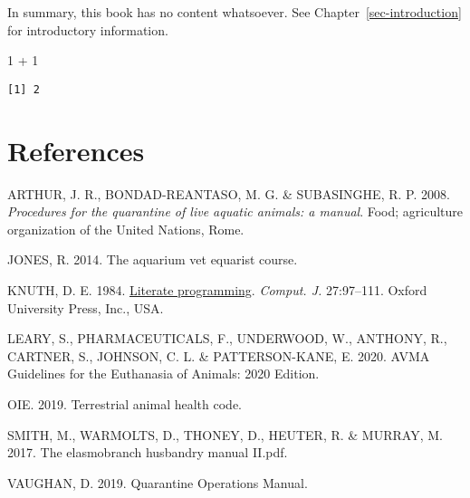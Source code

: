 \documentclass[
  letterpaper,
  DIV=11,
  numbers=noendperiod]{scrreprt}
\newenvironment{Shaded}{\begin{snugshade}}{\end{snugshade}}
\newcommand{\DecValTok}[1]{\textcolor[rgb]{0.25,0.63,0.44}{#1}}
\newcommand{\SpecialCharTok}[1]{\textcolor[rgb]{0.25,0.44,0.63}{#1}}
\newlength{\cslhangindent}
\newlength{\cslentryspacingunit} %
\newenvironment{CSLReferences}[2] %
 {%
  \setlength{\parindent}{0pt}
  \ifodd #1
  \let\oldpar\par
  \def\par{\hangindent=\cslhangindent\oldpar}
  \fi
  \setlength{\parskip}{#2\cslentryspacingunit}
 }%
 {}
\begin{document}
In summary, this book has no content whatsoever. See
Chapter~\ref{sec-introduction} for introductory information.

\begin{Shaded}
\begin{Highlighting}[]
\DecValTok{1} \SpecialCharTok{+} \DecValTok{1}
\end{Highlighting}
\end{Shaded}

\begin{verbatim}
[1] 2
\end{verbatim}


\hypertarget{references}{%
\chapter*{References}\label{references}}


\hypertarget{refs}{}
\begin{CSLReferences}{1}{0}
\leavevmode{}%
ARTHUR, J. R., BONDAD-REANTASO, M. G. \& SUBASINGHE, R. P. 2008.
\emph{Procedures for the quarantine of live aquatic animals: a manual}.
Food; agriculture organization of the United Nations, Rome.

\leavevmode{}%
JONES, R. 2014. The aquarium vet equarist course.

\leavevmode{}%
KNUTH, D. E. 1984.
\href{https://doi.org/10.1093/comjnl/27.2.97}{Literate programming}.
\emph{Comput. J.} 27:97--111. Oxford University Press, Inc., USA.

\leavevmode{}%
LEARY, S., PHARMACEUTICALS, F., UNDERWOOD, W., ANTHONY, R., CARTNER, S.,
JOHNSON, C. L. \& PATTERSON-KANE, E. 2020. AVMA Guidelines for the
Euthanasia of Animals: 2020 Edition.

\leavevmode{}%
OIE. 2019. Terrestrial animal health code.

\leavevmode{}%
SMITH, M., WARMOLTS, D., THONEY, D., HEUTER, R. \& MURRAY, M. 2017. The
elasmobranch husbandry manual II.pdf.

\leavevmode{}%
VAUGHAN, D. 2019. Quarantine Operations Manual.

\end{CSLReferences}
\end{document}
